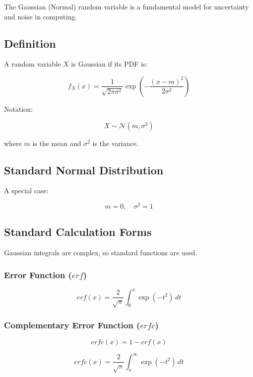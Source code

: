 \documentclass[12pt]{article}
\begin{document}
The Gaussian (Normal) random variable is a fundamental model for uncertainty and noise in computing.

\subsection{Definition}

A random variable $X$ is Gaussian if its PDF is:

\[
f_X(x) = \frac{1}{\sqrt{2\pi\sigma^2}}
\exp\left(-\frac{(x-m)^2}{2\sigma^2}\right)
\]

Notation:

\[
X \sim \mathcal{N}(m, \sigma^2)
\]

where $m$ is the mean and $\sigma^2$ is the variance.

\subsection{Standard Normal Distribution}

A special case:

\[
m = 0, \quad \sigma^2 = 1
\]

\subsection{Standard Calculation Forms}

Gaussian integrals are complex, so standard functions are used.

\subsubsection{Error Function ($erf$)}

\[
erf(x) = \frac{2}{\sqrt{\pi}}
\int_{0}^{x} \exp(-t^2)\, dt
\]

\subsubsection{Complementary Error Function ($erfc$)}

\[
erfc(x) = 1 - erf(x)
\]

\[
erfc(x) = \frac{2}{\sqrt{\pi}}
\int_{x}^{\infty} \exp(-t^2)\, dt
\]

\end{document}
